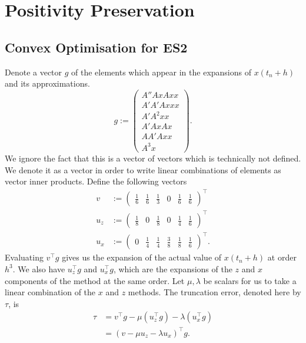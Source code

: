 \section{Positivity Preservation}

\subsection{Convex Optimisation for ES2}

Denote a vector $g$ of the elements which appear in the expansions of $x(t_n+h)$ and its approximations.
\begin{equation*}
    g := \begin{pmatrix}
        A'' Ax Ax x \\
        A' A' A xxx \\
        A' A^2 xx \\
        A' Ax Ax \\
        A A' A xx \\
        A^3 x
    \end{pmatrix}.
\end{equation*}
We ignore the fact that this is a vector of vectors which is technically not defined.
We denote it as a vector in order to write linear combinations of elements as vector inner products. %
Define the following vectors
\begin{align*}
    v &:= \begin{pmatrix}
        \frac{1}{6} & \frac{1}{6} & \frac{1}{3} & 0 & \frac{1}{6} & \frac{1}{6}
    \end{pmatrix}^\top \\
    u_z &:= \begin{pmatrix}
        \frac{1}{8} & 0 & \frac{1}{8} & 0 & \frac{1}{4} & \frac{1}{6}
    \end{pmatrix}^\top \\
    u_x &:= \begin{pmatrix}
        0 & \frac{1}{4} & \frac{1}{4} & \frac{3}{8} & \frac{1}{8} & \frac{1}{6}
    \end{pmatrix}^\top .
\end{align*}
Evaluating $v^\top g$ gives us the expansion of the actual value of $x(t_n+h)$ at order $h^3$.
We also have $u_z^\top g$ and $u_x^\top g$, which are the expansions of the $z$ and $x$ components of the method at the same order.
Let $\mu, \lambda$ be scalars for us to take a linear combination of the $x$ and $z$ methods.
The truncation error, denoted here by $\tau$, is
\begin{align*}
    \tau &= v^\top g - \mu ( u_z^\top g ) - \lambda ( u_x^\top g ) \\
    &= \left( v - \mu u_z - \lambda u_x \right)^\top g.
\end{align*}
